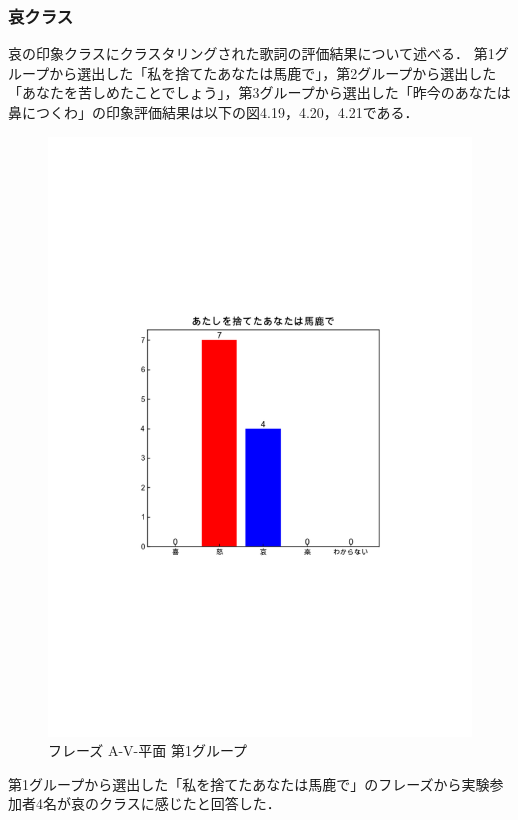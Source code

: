 \subsubsection{哀クラス}
哀の印象クラスにクラスタリングされた歌詞の評価結果について述べる．
第1グループから選出した「私を捨てたあなたは馬鹿で」，第2グループから選出した「あなたを苦しめたことでしょう」，第3グループから選出した「昨今のあなたは鼻につくわ」の印象評価結果は以下の図4.19，4.20，4.21である．
\begin{figure}[H]
    \centering
    \includegraphics[width=14cm]{437.pdf}
    \vspace{-1mm}
    \caption{フレーズ A-V-平面 第1グループ}
    \label{fig:mms}
    \vspace{5mm}
\end{figure}
第1グループから選出した「私を捨てたあなたは馬鹿で」のフレーズから実験参加者4名が哀のクラスに感じたと回答した．
